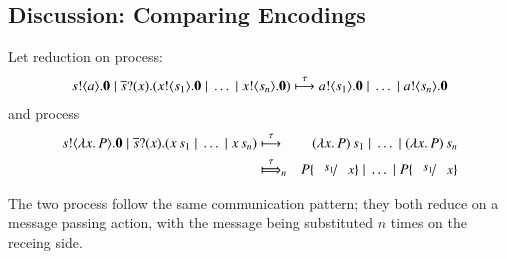 \subsection{Discussion: Comparing Encodings}


Let reduction on \sessp process:
\begin{eqnarray*}
	s ! \langle a \rangle . \mathbf{0} \;|\; \overline{s} ? (x) . (x ! \langle s_1 \rangle . \mathbf{0} \;|\; \dots \;|\; x ! \langle s_n \rangle . \mathbf{0})
	\stackrel{\tau}{\longmapsto}
	a ! \langle s_1 \rangle . \mathbf{0} \;|\; \dots \;|\; a ! \langle s_n \rangle . \mathbf{0}
\end{eqnarray*}
and \HO process
\begin{eqnarray*}
	\bout{s}{\abs{x}{P}} \inact \Par \binp{\dual{s}}{x} (\appl{x}{s_1} \Par \dots \Par \appl{x}{s_n})
	&\hby{\tau}&
	\appl{(\abs{x}{P})}{s_1} \Par \dots \Par \appl{(\abs{x}{P})}{s_n}\\
	&\Hby{\tau}_{n}&
	P \subst{s_1}{x} \Par \dots \Par P \subst{s_1}{x}
\end{eqnarray*}

The two process follow the same communication pattern; they both
reduce on a message passing action, with the
message being substituted $n$ times on the receing side.

